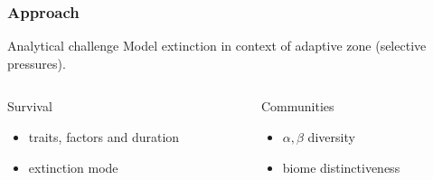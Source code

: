 \documentclass{beamer}
\begin{document}
\begin{frame}
  \frametitle{Approach}

  \begin{block}{Analytical challenge}
    Model extinction in context of adaptive zone (\alert{selective pressures}).
  \end{block}

  \vspace{1cm}

  \begin{columns}
    \begin{column}{0.5\textwidth}
      Survival
      \begin{itemize}
        \item traits, factors and duration
        \item extinction mode
      \end{itemize}
    \end{column}
    \begin{column}{0.5\textwidth}
      Communities
      \begin{itemize}
        \item \(\alpha, \beta\) diversity
        \item biome distinctiveness
      \end{itemize}
    \end{column}
  \end{columns}

\end{frame}
\end{document}

